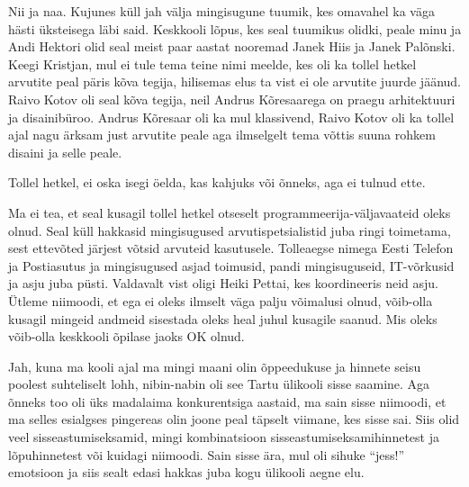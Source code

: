 
Nii ja naa. Kujunes küll jah välja mingisugune tuumik, kes  omavahel ka väga hästi üksteisega läbi said. Keskkooli lõpus, kes seal tuumikus olidki, peale minu ja Andi Hektori  olid seal meist paar aastat nooremad Janek Hiis ja Janek Palõnski. Keegi Kristjan, mul ei tule  tema teine nimi meelde, kes oli ka tollel hetkel arvutite peal päris kõva tegija, hilisemas elus ta vist ei ole arvutite juurde jäänud. Raivo Kotov oli seal kõva tegija, neil Andrus Kõresaarega  on praegu arhitektuuri ja disainibüroo. Andrus Kõresaar oli ka mul klassivend,  Raivo Kotov oli ka tollel ajal nagu ärksam just arvutite peale aga ilmselgelt tema võttis suuna rohkem disaini ja selle peale. 


Tollel hetkel, ei oska isegi öelda, kas kahjuks või õnneks, aga ei tulnud ette. 


Ma ei tea, et seal kusagil tollel hetkel otseselt programmeerija-väljavaateid oleks olnud. Seal küll hakkasid mingisugused arvutispetsialistid juba ringi toimetama, sest ettevõted järjest võtsid arvuteid kasutusele. Tolleaegse nimega Eesti Telefon ja Postiasutus ja mingisugused asjad toimusid, pandi mingisuguseid, IT-võrkusid ja asju juba püsti. Valdavalt vist oligi Heiki Pettai, kes  koordineeris  neid asju. Ütleme niimoodi, et ega ei oleks ilmselt väga palju võimalusi olnud,  võib-olla kusagil mingeid andmeid sisestada oleks heal juhul kusagile saanud. Mis oleks võib-olla keskkooli õpilase jaoks OK olnud. 


Jah, kuna ma kooli ajal ma mingi maani olin õppeedukuse ja hinnete seisu poolest suhteliselt lohh, nibin-nabin oli see Tartu ülikooli sisse saamine. Aga õnneks  too oli üks madalaima konkurentsiga aastaid, ma sain sisse niimoodi, et ma selles esialgses pingereas olin joone peal täpselt viimane, kes sisse sai. Siis olid veel sisseastumiseksamid, mingi kombinatsioon sisseastumiseksamihinnetest ja lõpuhinnetest või kuidagi niimoodi. Sain sisse ära, mul oli sihuke \enquote{jess!} emotsioon ja siis sealt edasi hakkas juba kogu  ülikooli aegne elu. 


